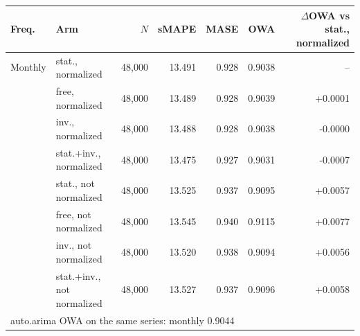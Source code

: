 \begin{tabular}{llrrrrr}
\toprule
Freq. & Arm & $N$ & sMAPE & MASE & OWA & $\Delta$OWA vs stat., normalized \\
\midrule
Monthly & stat., normalized & 48{,}000 & 13.491 & 0.928 & 0.9038 & -- \\
 & free, normalized & 48{,}000 & 13.489 & 0.928 & 0.9039 & +0.0001 \\
 & inv., normalized & 48{,}000 & 13.488 & 0.928 & 0.9038 & -0.0000 \\
 & stat.+inv., normalized & 48{,}000 & 13.475 & 0.927 & 0.9031 & -0.0007 \\
 & stat., not normalized & 48{,}000 & 13.525 & 0.937 & 0.9095 & +0.0057 \\
 & free, not normalized & 48{,}000 & 13.545 & 0.940 & 0.9115 & +0.0077 \\
 & inv., not normalized & 48{,}000 & 13.520 & 0.938 & 0.9094 & +0.0056 \\
 & stat.+inv., not normalized & 48{,}000 & 13.527 & 0.937 & 0.9096 & +0.0058 \\
\midrule
\multicolumn{7}{l}{\footnotesize auto.arima OWA on the same series: monthly 0.9044} \\
\bottomrule
\end{tabular}
